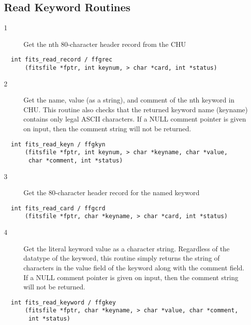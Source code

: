 \subsection{ Read Keyword Routines \label{FFGREC}}


\begin{description}
\item[1 ] Get the nth 80-character header record from the CHU
\end{description}

\begin{verbatim}
  int fits_read_record / ffgrec
      (fitsfile *fptr, int keynum, > char *card, int *status)
\end{verbatim}

\begin{description}
\item[2 ] Get the name, value (as a string), and comment of the nth keyword in CHU.
    This routine also checks that the returned keyword name (keyname) contains
    only legal ASCII characters. If a NULL comment pointer is given on input,
   then the comment string will not be returned.
\end{description}


\begin{verbatim}
  int fits_read_keyn / ffgkyn
      (fitsfile *fptr, int keynum, > char *keyname, char *value,
       char *comment, int *status)
\end{verbatim}

\begin{description}
\item[3 ] Get the 80-character header record for the named keyword
\end{description}

\begin{verbatim}
  int fits_read_card / ffgcrd
      (fitsfile *fptr, char *keyname, > char *card, int *status)
\end{verbatim}

\begin{description}
\item[4 ] Get the literal keyword value as a character string.  Regardless
    of the datatype of the keyword, this routine simply returns the
    string of characters in the value field of the keyword along with
    the comment field.   If a NULL comment pointer is given on input,
   then the comment string will not be returned.
\end{description}

\begin{verbatim}
  int fits_read_keyword / ffgkey
      (fitsfile *fptr, char *keyname, > char *value, char *comment,
       int *status)
\end{verbatim}

